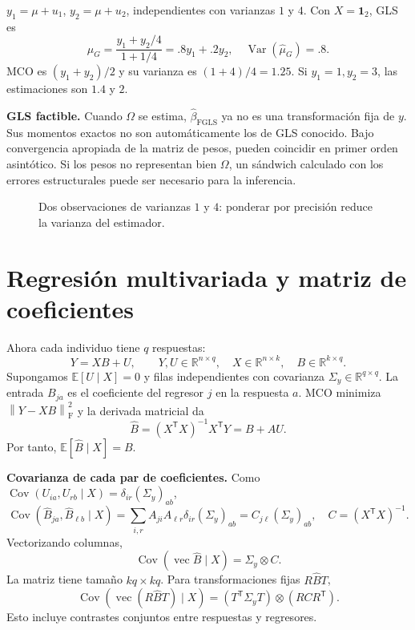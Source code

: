 \documentclass[11pt,a4paper]{article}
\newcommand{\R}{\mathbb R}
\newcommand{\E}{\mathbb E}
\newcommand{\T}{^{\mathsf T}}
\newcommand{\ones}{\mathbf 1}
\newcommand{\norm}[1]{\left\lVert #1\right\rVert}
\DeclareMathOperator{\Var}{Var}
\DeclareMathOperator{\Cov}{Cov}
\DeclareMathOperator{\vecop}{vec}
\newcommand{\F}{_{\mathrm F}}
\newcommand{\topic}[2]{\clearpage\section{#1}\label{#2}}
\theoremstyle{definition}\newtheorem{definicion}[teorema]{Definición}
\begin{document}
\begin{ejemplo}
$y_1=\mu+u_1$, $y_2=\mu+u_2$, independientes con varianzas $1$ y $4$.
Con $X=\ones_2$, GLS es
\[
\widehat\mu_G=\frac{y_1+y_2/4}{1+1/4}
=.8y_1+.2y_2,\quad \Var(\widehat\mu_G)=.8.
\]
MCO es $(y_1+y_2)/2$ y su varianza es $(1+4)/4=1.25$.
Si $y_1=1,y_2=3$, las estimaciones son $1.4$ y $2$.
\end{ejemplo}
\textbf{GLS factible.}
Cuando $\Omega$ se estima, $\widehat\beta_{\mathrm{FGLS}}$ ya no es
una transformación fija de $y$. Sus momentos exactos no son automáticamente
los de GLS conocido. Bajo convergencia apropiada de la matriz de pesos,
pueden coincidir en primer orden asintótico.
Si los pesos no representan bien $\Omega$, un sándwich calculado con
los errores estructurales puede ser necesario para la inferencia.


\begin{figure}[H]\centering
{}
\caption{Dos observaciones de varianzas $1$ y $4$: ponderar por precisión reduce la varianza del estimador.}
\end{figure}
\topic{Regresión multivariada y matriz de coeficientes}{s41}
Ahora cada individuo tiene $q$ respuestas:
\[
Y=XB+U,\qquad
Y,U\in\R^{n\times q},\quad X\in\R^{n\times k},\quad B\in\R^{k\times q}.
\]
Supongamos $\E[U\mid X]=0$ y filas independientes con covarianza
$\Sigma_y\in\R^{q\times q}$.
La entrada $B_{ja}$ es el coeficiente del regresor $j$ en la respuesta $a$.
MCO minimiza $\norm{Y-XB}\F^2$ y la derivada matricial da
\[
\widehat B=(X\T X)^{-1}X\T Y=B+AU.
\]
Por tanto, $\E[\widehat B\mid X]=B$.

\textbf{Covarianza de cada par de coeficientes.}
Como $\Cov(U_{ia},U_{rb}\mid X)=\delta_{ir}(\Sigma_y)_{ab}$,
\[
\Cov(\widehat B_{ja},\widehat B_{\ell b}\mid X)
=\sum_{i,r}A_{ji}A_{\ell r}\delta_{ir}(\Sigma_y)_{ab}
=\boxed{C_{j\ell}(\Sigma_y)_{ab}},
\quad C=(X\T X)^{-1}.
\]
Vectorizando columnas,
\[
\boxed{\Cov(\vecop\widehat B\mid X)=\Sigma_y\otimes C}.
\]
La matriz tiene tamaño $kq\times kq$.
Para transformaciones fijas $R\widehat BT$,
\[
\Cov(\vecop(R\widehat BT)\mid X)
=(T\T\Sigma_yT)\otimes(RCR\T).
\]
Esto incluye contrastes conjuntos entre respuestas y regresores.
\end{document}
